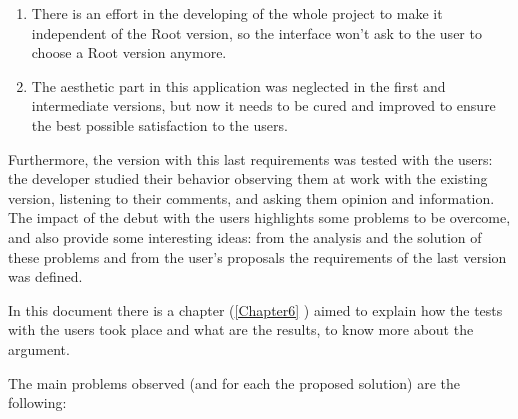 \begin{enumerate}
\item
There is an effort in the developing of the whole project to make it independent of the Root version, so the interface won't ask to the user to choose a Root version anymore. 

\item
The aesthetic part in this application was neglected in the first and intermediate versions, but now it needs to be cured and improved to ensure the best possible satisfaction to the users. 

\end{enumerate}
 
Furthermore, the version with this last requirements was tested with the users: the developer studied their behavior observing them at work with the existing version, listening to their comments, and asking them opinion and information. The impact of the debut with the users highlights some problems to be overcome, and also provide some interesting ideas: from the analysis and the solution of these problems and from the user's proposals the requirements of the last version was defined. 

In this document there is a chapter (\ref{Chapter6} ) aimed to explain how the tests with the users took place and what are the results, to know more about the argument.

The main problems observed (and for each the proposed solution) are the following:

